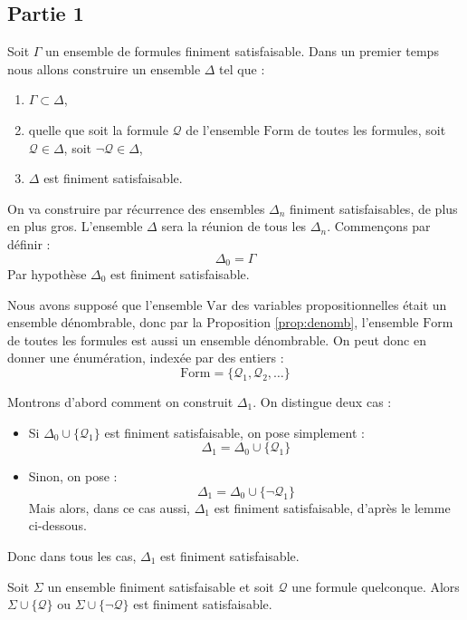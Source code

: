 \documentclass[11pt,class=report,crop=false]{standalone}
\begin{document}
\subsection{Partie 1}

Soit $\Gamma$ un ensemble de formules finiment satisfaisable. Dans un premier temps nous allons construire un ensemble $\Delta$ tel que :
\begin{enumerate}
	\item $\Gamma \subset \Delta$,
	
	\item quelle que soit la formule $\mathcal{Q}$ de l'ensemble $\text{Form}$ de toutes les formules, soit $\mathcal{Q} \in \Delta$, soit $\lnot \mathcal{Q} \in \Delta$,
	
	\item $\Delta$ est finiment satisfaisable.
\end{enumerate}


On va construire par récurrence des ensembles $\Delta_n$ finiment satisfaisables, de plus en plus gros. L'ensemble $\Delta$ sera la réunion de tous les $\Delta_n$. 
Commençons par définir :
\[
\Delta_0 = \Gamma
\]
Par hypothèse $\Delta_0$ est finiment satisfaisable.

\medskip

Nous avons supposé que l'ensemble $\text{Var}$ des variables propositionnelles était un ensemble dénombrable, donc par la Proposition \ref{prop:denomb}, l'ensemble $\text{Form}$ de toutes les formules est aussi un ensemble dénombrable. On peut donc en donner une énumération, indexée par des entiers :
\[
\text{Form} = \{ \mathcal{Q}_1, \mathcal{Q}_2, \ldots \}
\]

\medskip

Montrons d'abord comment on construit $\Delta_1$. On distingue deux cas :
\begin{itemize}
	\item Si $\Delta_0 \cup \{ \mathcal{Q}_1 \}$ est finiment satisfaisable, on pose simplement :
	\[
	\Delta_1 = \Delta_0 \cup \{ \mathcal{Q}_1 \}
	\]
	
	\item Sinon, on pose :
	\[
	\Delta_1 = \Delta_0 \cup \{ \lnot \mathcal{Q}_1 \}
	\]	
	Mais alors, dans ce cas aussi, $\Delta_1$ est finiment satisfaisable, d'après le lemme ci-dessous.
\end{itemize}
Donc dans tous les cas, $\Delta_1$ est finiment satisfaisable.


	\begin{lemme}
		\label{lem:finsas}
		Soit $\Sigma$ un ensemble finiment satisfaisable et soit $\mathcal{Q}$ une formule quelconque.
		Alors $\Sigma \cup \{ \mathcal{Q} \}$  ou $\Sigma \cup \{ \lnot \mathcal{Q} \}$ est finiment satisfaisable.
	\end{lemme}
	
\end{document}
